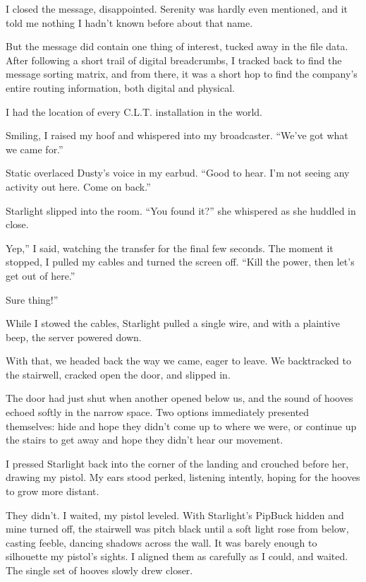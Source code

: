 I closed the message, disappointed. Serenity was hardly even mentioned, and it told me nothing I hadn’t known before about that name.

But the message did contain one thing of interest, tucked away in the file data. After following a short trail of digital breadcrumbs, I tracked back to find the message sorting matrix, and from there, it was a short hop to find the company’s entire routing information, both digital and physical.

I had the location of every C.L.T. installation in the world.

Smiling, I raised my hoof and whispered into my broadcaster. “We’ve got what we came for.”

Static overlaced Dusty’s voice in my earbud. “Good to hear. I’m not seeing any activity out here. Come on back.”

Starlight slipped into the room. “You found it?” she whispered as she huddled in close.

\leavevmode{}Yep,” I said, watching the transfer for the final few seconds. The moment it stopped, I pulled my cables and turned the screen off. “Kill the power, then let’s get out of here.”

\leavevmode{}Sure thing!”

While I stowed the cables, Starlight pulled a single wire, and with a plaintive beep, the server powered down.

With that, we headed back the way we came, eager to leave. We backtracked to the stairwell, cracked open the door, and slipped in.

The door had just shut when another opened below us, and the sound of hooves echoed softly in the narrow space. Two options immediately presented themselves: hide and hope they didn’t come up to where we were, or continue up the stairs to get away and hope they didn’t hear our movement.

I pressed Starlight back into the corner of the landing and crouched before her, drawing my pistol. My ears stood perked, listening intently, hoping for the hooves to grow more distant.

They didn’t. I waited, my pistol leveled. With Starlight’s PipBuck hidden and mine turned off, the stairwell was pitch black until a soft light rose from below, casting feeble, dancing shadows across the wall. It was barely enough to silhouette my pistol’s sights. I aligned them as carefully as I could, and waited. The single set of hooves slowly drew closer.

